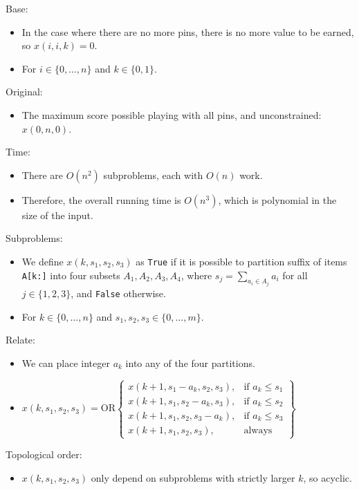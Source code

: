 \documentclass[12pt,twoside]{article}
\begin{document}
\begin{problems}
Base:
\begin{itemize}
    \item In the case where there are no more pins, there is no more value to be earned, so $x(i,i,k)=0$.
    \item For $i \in \{0,\ldots,n\}$ and $k \in \{0,1\}$.
\end{itemize}

Original:
\begin{itemize}
    \item The maximum score possible playing with all pins, and unconstrained: $x(0,n,0)$.
\end{itemize}

Time:
\begin{itemize}
    \item There are $O(n^2)$ subproblems, each with $O(n)$ work.
    \item Therefore, the overall running time is $O(n^3)$, which is polynomial in the size of the input.
\end{itemize}

\newpage
\problem  %

Subproblems:
\begin{itemize}
    \item We define $x(k,s_1,s_2,s_3)$ as \verb|True| if it is possible to partition suffix of items \verb|A[k:]| into four subsets $A_1,A_2,A_3,A_4$, where $s_j=\sum_{a_i\in A_j} a_i$ for all $j \in \{1,2,3\}$, and \verb|False| otherwise.
    \item For $k\in \{0,\ldots,n\}$ and $s_1,s_2,s_3 \in \{0,\ldots,m\}$.
\end{itemize}

Relate:
\begin{itemize}
    \item We can place integer $a_k$ into any of the four partitions.
    \item $x(k,s_1,s_2,s_3)=\text{OR}\left\{\begin{array}{lr}
        x(k+1,s_1-a_k,s_2,s_3), & \text{if } a_k \leq s_1 \\
        x(k+1,s_1,s_2-a_k,s_3), & \text{if } a_k \leq s_2 \\
        x(k+1,s_1,s_2,s_3-a_k), & \text{if } a_k \leq s_3 \\
        x(k+1,s_1,s_2,s_3), & \text{always}
    \end{array}\right\}$
\end{itemize}

Topological order:
\begin{itemize}
    \item $x(k,s_1,s_2,s_3)$ only depend on subproblems with strictly larger $k$, so acyclic.
\end{itemize}


\end{problems}
\end{document}
